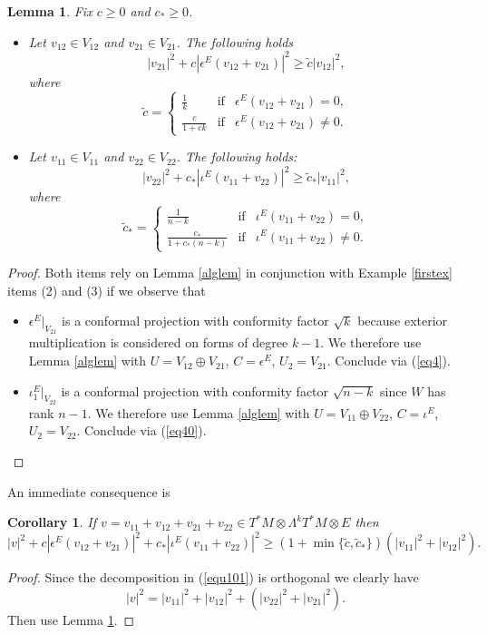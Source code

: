 \documentclass[12pt]{amsart} %
\newtheorem{lemma}[theorem]{Lemma}
\newtheorem{corollary}[theorem]{Corollary}
\theoremstyle{definition}
\numberwithin{equation}{section}
\begin{document}
\begin{lemma} \label{lemiii}
Fix $c\geq 0$ and $c_*\geq 0$. 
\begin{itemize}
\item[(i)]
 Let $v_{12}\in V_{12}$ and $v_{21}\in V_{21}$. The following holds
 \[ |v_{21}|^2+c |\epsilon^E(v_{12}+v_{21})|^2\geq \tilde{c}|v_{12}|^2 , \]
 where
\[\tilde{c}=\left\{\begin{array}{ccc} \frac{1}{k}&\mbox{if} &  \epsilon^ E(v_{12}+v_{21})=0 , \\
 \frac{c}{1+ck}&\mbox{if}&   \epsilon^ E(v_{12}+v_{21})\neq 0 .
\end{array}  \right. \]
\item[(ii)] 
 Let $v_{11}\in V_{11}$ and  $v_{22}\in V_{22}$.
 The following holds:
 \[ |v_{22}|^2+c_* |\iota^E(v_{11}+v_{22})|^2\geq \tilde{c}_*|v_{11}|^2 , \]
 where 
\[\tilde{c}_*=\left\{\begin{array}{ccc} \frac{1}{n-k}&\mbox{if} &  \iota^ E(v_{11}+v_{22})=0 , \\
 \frac{c_*}{1+c_*(n-k)}&\mbox{if}&   \iota^ E(v_{11}+v_{22})\neq 0 .
\end{array}  \right. \]
\end{itemize}
\end{lemma}
\begin{proof} Both items rely on Lemma \ref{alglem} in conjunction with  Example \ref{firstex} items (2) and (3) if we observe that
\begin{itemize}
\item[(i)] $\epsilon^ E\bigr|_{V_{21}}$ is a conformal projection with conformity factor $\sqrt{k}$ because exterior multiplication is considered on forms of degree $k-1$.
We therefore use Lemma \ref{alglem} with $U=V_{12}\oplus V_{21}$, $C=\epsilon^ E$, $U_2=V_{21}$. Conclude via (\ref{eq4}).
\item[(ii)] $\iota_1^ E\bigr|_{V_{22}}$ is a conformal projection with conformity factor $\sqrt{n-k}$ since $W$ has rank $n-1$. 
We therefore use Lemma \ref{alglem} with $U=V_{11}\oplus V_{22}$, $C=\iota^ E$, $U_2=V_{22}$. Conclude via (\ref{eq40}).
\end{itemize}
\end{proof}




An immediate consequence is 
\begin{corollary} \label{coro1} If $v=v_{11}+v_{12}+v_{21}+v_{22}\in T^*M\otimes \Lambda^kT^*M\otimes E$ then
\[ |v|^2+c|\epsilon^E(v_{12}+v_{21})|^2+c_* |\iota^E(v_{11}+v_{22})|^2\geq (1+\min\{\tilde{c},\tilde{c}_*\})(|v_{11}|^2+|v_{12}|^2).
\]
\end{corollary}
\begin{proof} Since the decomposition  in (\ref{equ101}) is orthogonal we clearly have 
\[|v|^ 2=|v_{11}|^ 2+|v_{12}|^ 2+(|v_{22}|^ 2+ |v_{21}|^ 2).\] 
Then use Lemma \ref{lemiii}.
\end{proof}
\end{document}
